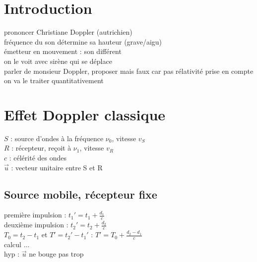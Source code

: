 


\biblio{}

\section*{Introduction}
prononcer Christiane Doppler (autrichien) \\
fréquence du son détermine sa hauteur (grave/aigu) \\
émetteur en mouvement : son différent \\
on le voit avec sirène qui se déplace \\
parler de monsieur Doppler, proposer mais faux car pas rélativité prise en compte \\
on va le traiter quantitativement \\



\section{Effet Doppler classique}
$S$ : source d'ondes à la fréquence $\nu_0$, vitesse $v_S$ \\
$R$ : récepteur, reçoit à $\nu_1$, vitesse $v_R$ \\
$c$ : célérité des ondes \\
$\vec{u}$ : vecteur unitaire entre S et R

\subsection{Source mobile, récepteur fixe}
première impulsion : $t_1'=t_1 + \frac{d_1}{c}$ \\
deuxième impulsion : $t_2'=t_2 + \frac{d_2}{c}$ \\
$T_0 = t_2 - t_1$ et $T'=t_2'-t_1'$ : $T'=T_0 + \frac{d_2-d_1}{c}$ \\
calcul ... \\
hyp : $\vec{u}$ ne bouge pas trop \\

